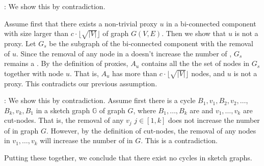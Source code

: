 : We show this by contradiction.

Assume first that there exists a non-trivial proxy $u$ in a bi-connected component with size larger than $c \cdot\lfloor\sqrt{|V|}\rfloor$ of graph $G(V, E)$.
Then we show that $u$ is not a proxy. Let $G_s$ be the subgraph of the bi-connected component with the removal of $u$. Since the removal of any node in a \bc doesn't increase the number of \ccs, $G_s$ remains a \cc. By the definition of proxies, $A_u$ contains all the  the set of nodes in $G_s$ together with node $u$. That is, $A_u$ has more than $c \cdot\lfloor\sqrt{|V|}\rfloor$ nodes, and $u$ is not a proxy. This contradicts our previous assumption.
\eop


: We show this by contradiction. Assume first there is a cycle $B_1, v_1, B_2, v_2, \ldots$, $B_k, v_k, B_1$ in a sketch graph $\mathbb{G}$ of graph $G$,
where $B_1, \ldots, B_k$ are \bccs and $v_1, \ldots, v_k$ are cut-nodes. That is, the removal of any $v_j$ $j\in[1, k]$ does not increase the number of \ccs in graph $G$.
%
However, by the definition of cut-nodes, the removal of any nodes in $v_1, \ldots, v_k$ will increase the number of \ccs in $G$. This is a contradiction.

Putting these together, we conclude that there exist no cycles in sketch graphs.
\eop
